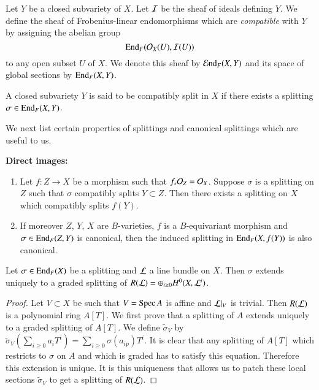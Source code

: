Let $Y$ be a closed subvariety of $X$. Let $\mathcal{I}$ be the sheaf of ideals
defining $Y$. We define the sheaf of Frobenius-linear endomorphisms
which are {\em compatible} with $Y$ by assigning the abelian group
$$
\operatorname{End}_{F}(\mathcal{O}_{X}(U),\mathcal{I}(U))
$$ 
to any open subset $U$ of $X$. We denote
this sheaf by $\operatorname{\mathcal{E}nd}_{F}(X,Y)$ and its space of global sections by
$\operatorname{End}_{F}(X,Y)$. 

\begin{definition}\label{chap4-defi4.3.10}
A closed subvariety $Y$ is said to be compatibly split in $X$ if there
exists a splitting $\sigma\in \operatorname{End}_{F}(X,Y)$.
\end{definition}

We next list certain properties of splittings and canonical splittings
which are useful to us. 

\medskip
\noindent
{\bf Direct images:}\pageoriginale
\begin{enumerate}
\item Let\label{page43} $f:Z\to X$ be a morphism such that
  $f_{\ast}\mathcal{O}_{Z}=\mathcal{O}_{X}$. Suppose $\sigma$ is a splitting on $Z$ such
  that $\sigma$ compatibly splits $Y\subset Z$. Then there exists a
  splitting on $X$ which compatibly splits $f(Y)$.

\item If moreover $Z$, $Y$, $X$ are $B$-varieties, $f$ is a
  $B$-equivariant morphism and $\sigma\in \operatorname{End}_{F}(Z,Y)$ is canonical,
then the induced splitting in $\operatorname{End}_{F}(X,f(Y))$ is also canonical.
\end{enumerate}

\begin{lemma}\label{chap4-lem4.3.11}
Let $\sigma\in \operatorname{End}_{F}(X)$ be a splitting and $\mathcal{L}$ a line bundle on
$X$. Then $\sigma$ extends uniquely to a graded splitting of
$R(\mathcal{L})=\oplus_{i\geq 0}H^{0}(X,\mathcal{L}^{i})$.
\end{lemma}

\begin{proof}
Let $V\subset X$ be such that $V=\operatorname{Spec} A$ is affine and $\mathcal{L}|_{V}$ is
trivial. Then $R(\mathcal{L})$ is a polynomial ring $A[T]$. We first prove that
a splitting of $A$ extends uniquely to a graded splitting of
$A[T]$. We define $\tilde{\sigma}_{V}$ by
$\tilde{\sigma}_{V}(\sum_{i\geq 0}a_{i}T^{i})=\sum_{i\geq
  0}\sigma(a_{ip})T^{i}$. It is clear that any splitting of $A[T]$
which restricts to $\sigma$ on $A$ and which is graded has to satisfy
this equation. Therefore this extension is unique. It is this
uniqueness that allows us to patch these local sections
$\tilde{\sigma}_{V}$ to get a splitting of $R(\mathcal{L})$. 
\end{proof}

